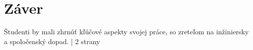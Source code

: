\chapter{Záver}
\par{
Študenti by mali zhrnúť kľúčové aspekty svojej práce, so zreteľom na inžiniersky a spoločenský dopad. | 2 strany
}
